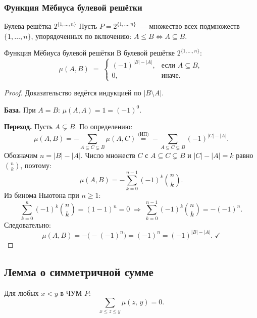 \subsubsection*{Функция Мёбиуса булевой решётки}

\begin{Example}{Булева решётка $2^{\{1,\ldots,n\}}$}{}
	Пусть $P = 2^{\{1,\ldots,n\}}$~--- множество всех подмножеств
	$\{1,\ldots,n\}$, упорядоченных по включению: $A \leq B \Leftrightarrow A \subseteq B$.
\end{Example}

\begin{Theorem}{Функция Мёбиуса булевой решётки}{}
	В булевой решётке $2^{\{1,\ldots,n\}}$:
	\[
	\mu(A,B)
	\;=\;
	\begin{cases}
		(-1)^{|B|-|A|}, & \text{если } A \subseteq B,\\
		0,              & \text{иначе.}
	\end{cases}
	\]
\end{Theorem}

\begin{proof}
	Доказательство ведётся индукцией по $|B \setminus A|$.
	
	\textbf{База.} При $A = B$: $\mu(A,A) = 1 = (-1)^0$.\;\checkmark
	
	\textbf{Переход.} Пусть $A \subsetneq B$. По определению:
	\[
	\mu(A,B)
	= -\sum_{A \subseteq C \subsetneq B}\mu(A,C)
	\stackrel{\text{(ИП)}}{=}
	-\sum_{A \subseteq C \subsetneq B}(-1)^{|C|-|A|}.
	\]
	Обозначим $n = |B|-|A|$. Число множеств $C$ с $A\subseteq C\subsetneq B$
	и $|C|-|A|=k$ равно $\binom{n}{k}$, поэтому:
	\[
	\mu(A,B)
	= -\sum_{k=0}^{n-1}(-1)^k\binom{n}{k}.
	\]
	Из бинома Ньютона при $n \geq 1$:
	\[
	\sum_{k=0}^{n}(-1)^k\binom{n}{k}
	= (1-1)^n = 0
	\;\Longrightarrow\;
	\sum_{k=0}^{n-1}(-1)^k\binom{n}{k}
	= -(-1)^n.
	\]
	Следовательно:
	\[
	\mu(A,B)
	= -\bigl(-(-1)^n\bigr)
	= (-1)^n
	= (-1)^{|B|-|A|}.\;\checkmark
	\]
\end{proof}

\subsection{Лемма о симметричной сумме}

\begin{Lemma}{}{}
	Для любых $x < y$ в ЧУМ $P$:
	\[
	\sum_{x \leq z \leq y} \mu(z,\, y) = 0.
	\]
\end{Lemma}

